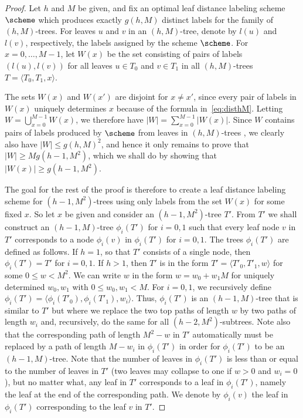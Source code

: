 \begin{proof}
Let $h$ and $M$ be given, and fix an optimal leaf distance labeling scheme $\scheme$ which produces exactly $g(h,M)$ distinct labels for the family of $(h,M)$-trees. For leaves $u$ and $v$ in an $(h,M)$-tree, denote by $l(u)$ and $l(v)$, respectively, the labels assigned by the scheme $\scheme$. For $x=0,\dots ,M-1$, let $W(x)$ be the set consisting of pairs of labels $(l(u),l(v))$ for all leaves $u\in T_0$ and $v\in T_1$ in all $(h,M)$-trees $T=\langle T_0,T_1,x\rangle$.

The sets $W(x)$ and $W(x')$ are disjoint for $x\neq x'$, since every pair of labels in $W(x)$ uniquely determines $x$ because of the formula in~\eqref{eq:disthM}. Letting $W=\bigcup_{x=0}^{M-1}W(x)$, we therefore have $|W|=\sum_{x=0}^{M-1}|W(x)|$. 
Since $W$ contains pairs of labels produced by $\scheme$ from leaves in $(h,M)$-trees , we clearly also have $|W|\leq g(h,M)^2$, and hence it only remains to prove that $|W|\geq Mg(h-1,M^2)$, which we shall do by showing that $|W(x)|\geq g(h-1,M^2)$.

The goal for the rest of the proof is therefore to create a leaf distance labeling scheme for $(h-1,M^2)$-trees using only labels from the set $W(x)$ for some fixed $x$. So let $x$ be given and consider an $(h-1,M^2)$-tree $T'$. From $T'$ we shall construct an $(h-1,M)$-tree $\phi_i(T')$ for $i=0,1$ such that every leaf node $v$ in $T'$ corresponds to a node $\phi_i(v)$ in $\phi_i(T')$ for $i=0,1$.
The trees $\phi_i(T')$ are defined as follows.
If $h=1$, so that $T'$ consists of a single node, then $\phi_i(T')=T'$ for $i=0,1$. 
If $h>1$, then $T'$ is in the form $T'=\langle T'_0,T'_1,w\rangle$ for some $0\leq w< M^2$. We can write $w$ in the form $w=w_0+w_1M$ for uniquely determined $w_0,w_1$ with $0\leq w_0,w_1<M$. For $i=0,1$, we recursively define $\phi_i(T') = \langle \phi_i(T'_0), \phi_i(T'_1),w_i\rangle$. Thus, $\phi_i(T')$ is an $(h-1,M)$-tree that is similar to $T'$ but where we replace the two top paths of length $w$ by two paths of length $w_i$ and, recursively, do the same for all $(h-2,M^2)$-subtrees. Note also that the corresponding path of length $M^2-w$ in $T'$ automatically must be replaced by a path of length $M-w_i$ in $\phi_i(T')$ in order for $\phi_i(T')$ to be an $(h-1,M)$-tree.
Note that the number of leaves in $\phi_i(T')$ is less than or equal to the number of leaves in $T'$ (two leaves may collapse to one if $w>0$ and $w_i=0$), but no matter what, any leaf in $T'$ corresponds to a leaf in $\phi_i(T')$, namely the leaf at the end of the corresponding path. We denote by $\phi_i(v)$ the leaf in $\phi_i(T')$ corresponding to the leaf $v$ in $T'$.


\end{proof}
